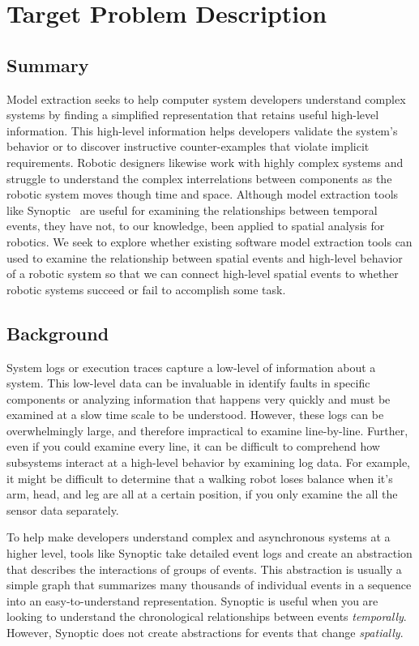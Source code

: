 \section{Target Problem Description}

\subsection{Summary}

Model extraction seeks to help computer system developers understand complex systems by finding a simplified representation that retains useful high-level information.
This high-level information helps developers validate the system's behavior or to discover instructive counter-examples that violate implicit requirements. 
Robotic designers likewise work with highly complex systems and struggle to understand the complex interrelations between components as the robotic system moves though time and space.
Although model extraction tools like Synoptic~\cite{schneider2010synoptic} are useful for examining the relationships between temporal events, they have not, to our knowledge, been applied to spatial analysis for robotics. 
We seek to explore whether existing software model extraction tools can used to examine the relationship between spatial events and high-level behavior of a robotic system so that we can connect high-level spatial events to whether robotic systems succeed or fail to accomplish some task.

\subsection{Background}

System logs or execution traces capture a low-level of information about a system. 
This low-level data can be invaluable in identify faults in specific components or analyzing information that happens very quickly and must be examined at a slow time scale to be understood.
However, these logs can be overwhelmingly large, and therefore impractical to examine line-by-line.
Further, even if you could examine every line, it can be difficult to comprehend how subsystems interact at a high-level behavior by examining log data.
For example, it might be difficult to determine that a walking robot loses balance when it's arm, head, and leg are all at a certain position, if you only examine the all the sensor data separately.

To help make developers understand complex and asynchronous systems at a higher level, tools like Synoptic take detailed event logs and create an abstraction that describes the interactions of groups of events.
This abstraction is usually a simple graph that summarizes many thousands of individual events in a sequence into an easy-to-understand representation.
Synoptic is useful when you are looking to understand the chronological relationships between events \emph{temporally}.
However, Synoptic does not create abstractions for events that change \emph{spatially}.

